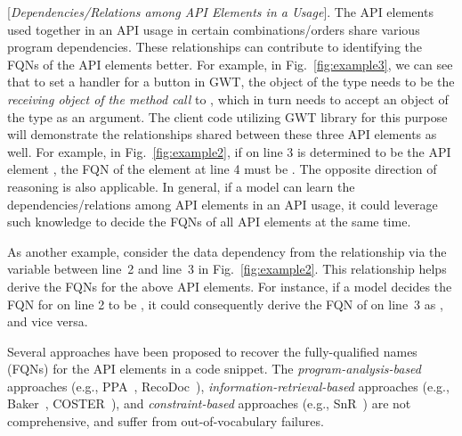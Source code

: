 

\vspace{2pt}
 [{\em Dependencies/Relations among API Elements in a Usage}].
The API elements used together in an API usage in certain combinations/orders share various program dependencies. These relationships can contribute to identifying the FQNs of the API elements better. For example, in Fig.~\ref{fig:example3}, we can see that to set a handler for a button in GWT, the object of the type  needs to be the {\em receiving object of the method call} to , which in turn needs to accept an object of the type  as an argument. The client code utilizing GWT library for this purpose will demonstrate the relationships shared between these three API elements as well. For example, in Fig.~\ref{fig:example2}, if  on line 3 is determined to be the API element , the FQN of the element at line 4 must be . The opposite direction of reasoning is also applicable. In general, if a model can learn the dependencies/relations among API elements in an API usage, it could leverage such knowledge to decide the FQNs of all API elements at the same time.

As another example, consider the data dependency from the  relationship via the variable  between line~2 and line~3 in Fig.~\ref{fig:example2}. This relationship helps derive the FQNs for the above API elements. For instance, if a model decides the FQN for  on line 2 to be , it could consequently derive the FQN of  on line~3 as , and vice versa.

\vspace{2pt}
 Several approaches have been proposed to recover the fully-qualified names (FQNs) for the API elements in a code snippet. The {\em program-analysis-based} approaches (e.g., PPA~\cite{dagenais-oopsla08}, RecoDoc~\cite{dagenais-icse12}), {\em information-retrieval-based} approaches (e.g., Baker~\cite{liveapi14}, COSTER~\cite{coster-ase19}), and {\em constraint-based} approaches (e.g., SnR~\cite{snr-icse22}) are not comprehensive, and suffer from out-of-vocabulary failures. %

